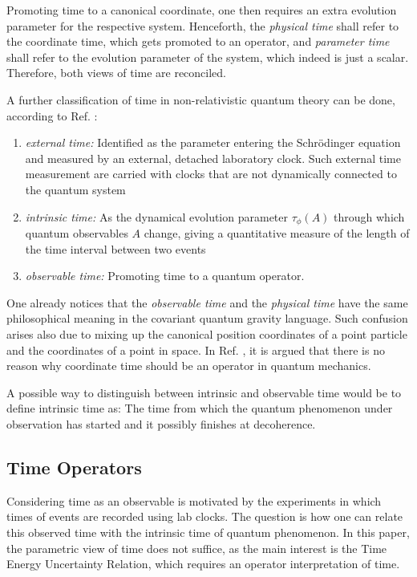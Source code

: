 \documentclass[a4paper,10pt]{article}
\numberwithin{equation}{section}
\begin{document}
Promoting time to a canonical coordinate, one then requires an extra evolution parameter for the respective system. Henceforth, the \textit{physical time} shall refer to the coordinate time, which gets promoted to an operator, and \textit{parameter time} shall refer to the evolution parameter of the system, which indeed is just a scalar. Therefore, both views of time are reconciled.

A further classification of time in non-relativistic quantum theory can be done, according to Ref. \cite{BuschTEUR}:
\begin{enumerate}
    \item \textit{external time:} Identified as the parameter entering the Schrödinger equation and measured by an external, detached laboratory clock. Such external time measurement are carried with clocks that are not dynamically connected to the quantum system
    
    \item \textit{intrinsic time:} As the dynamical evolution parameter $\tau_\phi(A)$ through which quantum observables $A$ change, giving a quantitative measure of the length of the time interval between two events
    
    \item \textit{observable time:} Promoting time to a quantum operator. 
    
\end{enumerate}

One already notices that the \textit{observable time} and the \textit{physical time} have the same philosophical meaning in the covariant quantum gravity language. Such confusion arises also due to mixing up the canonical position coordinates of a point particle and the coordinates of a point in space. In Ref. \cite{JanNoTimeCoordinate}, it is argued that there is no reason why coordinate time should be an operator in quantum mechanics.

A possible way to distinguish between intrinsic and observable time would be to define intrinsic time as: The time from which the quantum phenomenon under observation has started and it possibly finishes at decoherence. 


\subsection{Time Operators}

Considering time as an observable is motivated by the experiments in which times of events are recorded using lab clocks. The question is how one can relate this observed time with the intrinsic time of quantum phenomenon. In this paper, the parametric view of time does not suffice, as the main interest is the Time Energy Uncertainty Relation, which requires an operator interpretation of time. 
\end{document}
